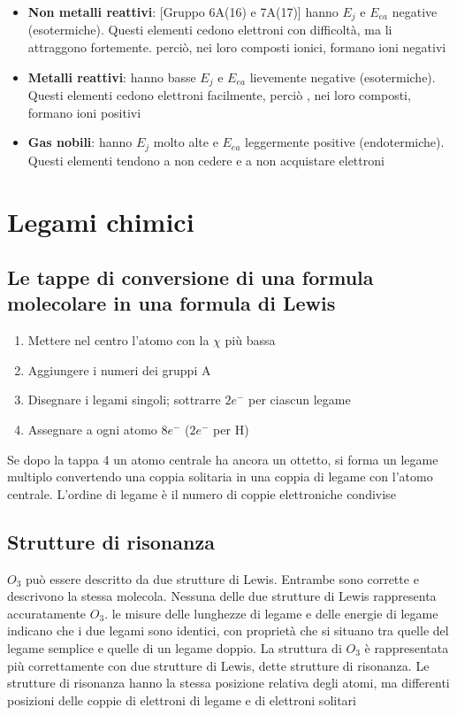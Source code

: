 \documentclass[a4paper,11pt]{report}
\begin{document}
\begin{itemize}
	\item \textbf{Non metalli reattivi}: [Gruppo 6A(16) e 7A(17)] hanno $E_j$ e $E_{ea}$ negative (esotermiche). Questi elementi cedono elettroni con difficoltà, ma li attraggono fortemente. perciò, nei loro composti ionici, formano ioni negativi
	\item \textbf{Metalli reattivi}: hanno basse $E_j$ e $E_{ea}$ lievemente negative (esotermiche). Questi elementi cedono elettroni facilmente, perciò , nei loro composti, formano ioni positivi
	\item \textbf{Gas nobili}: hanno $E_j$ molto alte e $E_{ea}$ leggermente positive (endotermiche). Questi elementi tendono a non cedere e a non acquistare elettroni
\end{itemize}

\chapter{Legami chimici}

\section{Le tappe di conversione di una formula molecolare in una formula di Lewis}

\begin{enumerate}
	\item Mettere nel centro l'atomo con la $\chi$ più bassa
	\item Aggiungere i numeri dei gruppi A
	\item Disegnare i legami singoli; sottrarre $2e^-$ per ciascun legame
	\item Assegnare a ogni atomo $8e^-$ ($2e^-$ per H)
\end{enumerate}

\noindent Se dopo la tappa 4 un atomo centrale ha ancora un ottetto, si forma un legame multiplo convertendo una coppia solitaria in una coppia di legame con l'atomo centrale. L'ordine di legame è il numero di coppie elettroniche condivise

\section{Strutture di risonanza}

$O_3$ può essere descritto da due strutture di Lewis. Entrambe sono corrette e descrivono la stessa molecola. Nessuna delle due strutture di Lewis rappresenta accuratamente $O_3$. le misure delle lunghezze di legame e delle energie di legame indicano che i due legami sono identici, con proprietà che si situano tra quelle del legame semplice e quelle di un legame doppio. La struttura di $O_3$ è rappresentata più correttamente con due strutture di Lewis, dette strutture di risonanza. \newline
Le strutture di risonanza hanno la stessa posizione relativa degli atomi, ma differenti posizioni delle coppie di elettroni di legame e di elettroni solitari
\end{document}
